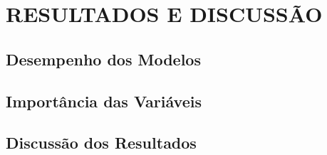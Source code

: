 \chapter{RESULTADOS E DISCUSS\~AO}
\label{cap:capitulo4}

\section{Desempenho dos Modelos}

\section{Importância das Variáveis}

\section{Discuss\~ao dos Resultados}
